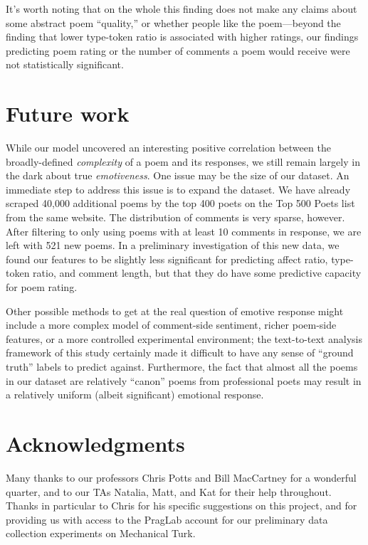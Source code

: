 \documentclass[11pt]{article}
\begin{document}
It's worth noting that on the whole this finding does not make any claims about some abstract poem ``quality,'' or whether people like the poem---beyond the finding that lower type-token ratio is associated with higher ratings, our findings predicting poem rating or the number of comments a poem would receive were not statistically significant. 

\section{Future work}

While our model uncovered an interesting positive correlation between the broadly-defined \emph{complexity} of a poem and its responses, we still remain largely in the dark about true \emph{emotiveness}. One issue may be the size of our dataset. An immediate step to address this issue is to expand the dataset. We have already scraped 40,000 additional poems by the top 400 poets on the Top 500 Poets list from the same website. The distribution of comments is very sparse, however. After filtering to only using poems with at least 10 comments in response, we are left with 521 new poems. In a preliminary investigation of this new data, we found our features to be slightly less significant for predicting affect ratio, type-token ratio, and comment length, but that they do have some predictive capacity for poem rating.

Other possible methods to get at the real question of emotive response might include a more complex model of comment-side sentiment, richer poem-side features, or a more controlled experimental environment; the text-to-text analysis framework of this study certainly made it difficult to have any sense of ``ground truth'' labels to predict against. Furthermore, the fact that almost all the poems in our dataset are relatively ``canon'' poems from professional poets may result in a relatively uniform (albeit significant) emotional response. 



\section*{Acknowledgments}

Many thanks to our professors Chris Potts and Bill MacCartney for a wonderful quarter, and to our TAs Natalia, Matt, and Kat for their help throughout. Thanks in particular to Chris for his specific suggestions on this project, and for providing us with access to the PragLab account for our preliminary data collection experiments on Mechanical Turk.




\end{document}
